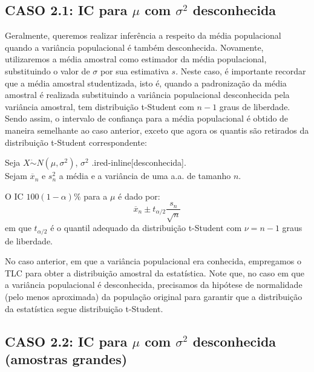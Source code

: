 \documentclass[
]{book}
\theoremstyle{definition}
\theoremstyle{definition}
\theoremstyle{definition}
\theoremstyle{remark}
\begin{document}
\hypertarget{caso-2.1-ic-para-mu-com-sigma2-desconhecida}{%
\subsection*{\texorpdfstring{CASO 2.1: IC para \(\mu\) com \(\sigma^2\) desconhecida}{CASO 2.1: IC para \textbackslash mu com \textbackslash sigma\^{}2 desconhecida}}\label{caso-2.1-ic-para-mu-com-sigma2-desconhecida}}

Geralmente, queremos realizar inferência a respeito da média populacional quando a variância populacional é também desconhecida. Novamente, utilizaremos a média amostral como estimador da média populacional, substituindo o valor de \(\sigma\) por sua estimativa \(s\). Neste caso, é importante recordar que a média amostral studentizada, isto é, quando a padronização da média amostral é realizada substituindo a variância populacional desconhecida pela variância amostral, tem distribuição t-Student com \(n-1\) graus de liberdade. Sendo assim, o intervalo de confiança para a média populacional é obtido de maneira semelhante ao caso anterior, exceto que agora os quantis são retirados da distribuição t-Student correspondente:

Seja
\(X \dot{\sim} N(\mu, \sigma^2)\), \(\sigma^2\) .ired-inline{[}desconhecida{]}.\\
Sejam \(\overline{x}_n\) e \(s^2_n\) a média e a variância de uma a.a. de tamanho \(n\).

O IC \(100(1-\alpha)\%\) para a \(\mu\) é dado por:
\[\overline{x}_n \pm t_{\alpha/2} \frac{s_n}{\sqrt{n}}\]
em que \(t_{\alpha/2}\) é o quantil adequado da distribuição t-Student com \(\nu = n-1\) graus de liberdade.

No caso anterior, em que a variância populacional era conhecida, empregamos o TLC para obter a distribuição amostral da estatística. Note que, no caso em que a variância populacional é desconhecida, precisamos da hipótese de normalidade (pelo menos aproximada) da população original para garantir que a distribuição da estatística segue distribuição t-Student.

\hypertarget{caso-2.2-ic-para-mu-com-sigma2-desconhecida-amostras-grandes}{%
\subsection*{\texorpdfstring{CASO 2.2: IC para \(\mu\) com \(\sigma^2\) desconhecida (amostras grandes)}{CASO 2.2: IC para \textbackslash mu com \textbackslash sigma\^{}2 desconhecida (amostras grandes)}}\label{caso-2.2-ic-para-mu-com-sigma2-desconhecida-amostras-grandes}}
\end{document}
